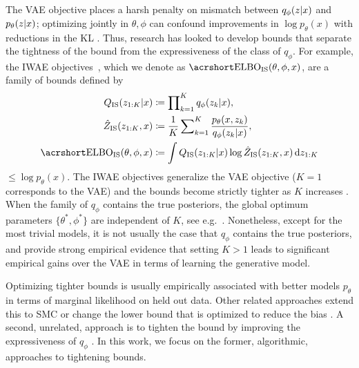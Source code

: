 The \gls{VAE} objective places a harsh penalty on mismatch between $q_{\phi}(z \lvert x)$ and $p_{\theta}(z \lvert x)$; optimizing jointly in $\theta, \phi$ can confound improvements in $\log p_{\theta}(x)$ with reductions in the KL \citep{Turner2011two}. Thus, research has looked to develop bounds that separate the tightness of the bound from the expressiveness of the class of $q_{\phi}$. For example, the \gls{IWAE} objectives~\citep{Burda2016importance}, which we
denote as $\ELBO_{\text{IS}}(\theta, \phi, x)$, are a family of bounds defined by
\begin{align}
	Q_{\text{IS}}(z_{1:K} \given x) &\coloneqq \prod\nolimits_{k = 1}^K q_{\phi}(z_k \given x), \nonumber
	\\
	\hat Z_{\text{IS}}(z_{1:K}, x) &\coloneqq \frac{1}{K}\sum\nolimits_{k = 1}^K \frac{p_{\theta}(x, z_k)}{q_{\phi}(z_k \given x)}, \label{eq:background/q_is_z_is}\\
	\ELBO_{\text{IS}}(\theta, \phi, x) &\coloneqq \int Q_{\text{IS}}(z_{1:K} \given x) \log \hat Z_{\text{IS}}(z_{1:K}, x) \,\mathrm dz_{1:K}
	\nonumber
\end{align}
$\leq \log p_{\theta}(x)$.
The \gls{IWAE} objectives generalize the \gls{VAE} objective ($K=1$ corresponds to the \gls{VAE}) and the bounds become strictly tighter as $K$ increases \cite{Burda2016importance}. When the family of $q_{\phi}$ contains the true posteriors, the global optimum parameters $\{\theta^*,\phi^*\}$ are independent of $K$, see e.g.~\cite{Le2017auto}. Nonetheless, except for the most trivial models, it is not usually the case that $q_{\phi}$ contains the true posteriors, and \citet{Burda2016importance} provide strong empirical evidence that setting
$K>1$ leads to significant empirical gains over the \gls{VAE} in terms of learning the
generative model. 

Optimizing tighter bounds is usually empirically associated with 
better models $p_{\theta}$ in 
terms of marginal likelihood on held out data.
Other related approaches extend this to \gls{SMC} \citep{maddison2017filtering, Le2017auto,naesseth2017variational} or change the lower bound that is optimized to reduce the bias \citep{Li2016renyi,Bamler2017perturbative}.
A second, unrelated, approach is to tighten the bound by improving the expressiveness of $q_{\phi}$ \citep{salimans_markov_2015, tran_variational_2015, rezende_variational_2015, kingma2016improving, maaloe_auxiliary_2016, ranganath2016hierarchical}.
In this work, we focus on the former, algorithmic, approaches to tightening bounds. 


